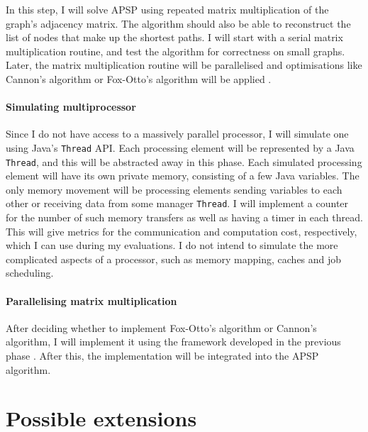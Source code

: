 \documentclass{article}
\begin{document}
In this step, I will solve APSP using repeated matrix multiplication of the
graph's adjacency matrix.  The algorithm should also be able to reconstruct the
list of nodes that make up the shortest paths. I will start with a serial
matrix multiplication routine, and test the algorithm for correctness on small
graphs. Later, the matrix multiplication routine will be parallelised and optimisations
like Cannon's algorithm or Fox-Otto's algorithm will be applied \cite{fox,cannon}. 

\paragraph{Simulating multiprocessor}%
\label{par:Simulating Multiprocessor}

Since I do not have access to a massively parallel processor, I will simulate
one using Java's \texttt{Thread} API.  Each processing element will be
represented by a Java \texttt{Thread}, and this will be abstracted away in this
phase.  Each simulated processing element will have its own private memory,
consisting of a few Java variables. The only memory movement will be processing
elements sending variables to each other or receiving data from some manager
\texttt{Thread}. I will implement a counter for the number of such memory
transfers as well as having a timer in each thread. This will give metrics for
the communication and computation cost, respectively, which I can use during
my evaluations. I do not intend to simulate the more complicated aspects of
a processor, such as memory mapping, caches and job scheduling.

\paragraph{Parallelising matrix multiplication}%
\label{par:Parallelising Matrix Multiplication}

After deciding whether to implement Fox-Otto's algorithm or Cannon's algorithm,
I will implement it using the framework developed in the previous phase
\cite{fox, cannon}. After this, the implementation will be integrated into the
APSP algorithm.

\section*{Possible extensions}%
\label{sec:Possible extensions}
\end{document}
